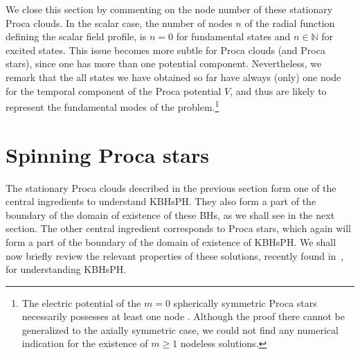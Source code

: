 \documentclass{article}
\numberwithin{equation}{section}
\begin{document}
We close this section by commenting on the node number of these stationary Proca clouds. 
In the scalar case, the number of nodes $n$ of the radial function defining the scalar field profile, 
is $n=0$ for fundamental states and $n\in \mathbb{N}$ for excited states. 
This issue becomes more subtle for Proca clouds (and Proca stars), 
since one has more than one potential component. Nevertheless, we remark that the all states we have obtained so far have always (only)
one node for the temporal component of the Proca potential  $V$, and thus are likely to represent the fundamental
modes of the problem.\footnote{The electric potential of the $m=0$ 
spherically symmetric Proca stars necessarily possesses at least one node \cite{Brito:2015pxa}.
Although the proof there cannot be generalized to the axially symmetric case,
we could not find any numerical indication for the existence of $m\geq 1$ nodeless solutions. 
}

 

\section{Spinning Proca stars} 
\label{sec_stars}
The stationary Proca clouds described in the previous section form one of the central ingredients to understand KBHsPH. They also form a part of the boundary of the domain of existence of these BHs, as we shall see in the next section. The other central ingredient corresponds to Proca stars, which again will form a part of the boundary of the domain of existence of KBHsPH. We shall now briefly review the relevant properties of these solutions, recently found in~\cite{Brito:2015pxa}, for understanding KBHsPH.
\end{document}
